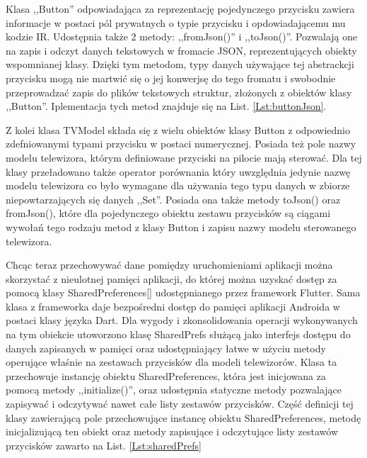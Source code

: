 \documentclass[12pt,twoside]{article}
\begin{document}
Klasa ,,Button'' odpowiadająca za reprezentację  pojedynczego przycisku zawiera informacje w postaci pól prywatnych o typie przycisku i opdowiadającemu mu kodzie IR. Udostępnia także 2 metody: ,,fromJson()'' i ,,toJson()''. Pozwalają one na zapis i odczyt danych tekstowych w fromacie JSON, reprezentujących obiekty wspomnianej klasy. Dzięki tym metodom, typy danych używające tej abstrackcji przycisku mogą nie martwić się o jej konwerjsę do tego fromatu i swobodnie przeprowadzać zapis do plików tekstowych struktur, złożonych z obiektów klasy ,,Button''. Iplementacja tych metod znajduje się na List. \ref*{Lst:buttonJson}.


Z kolei klasa TVModel składa się z wielu obiektów klasy Button z odpowiednio zdefniowanymi typami przycisku w postaci numerycznej. Posiada też pole nazwy modelu telewizora, którym definiowane przyciski na pilocie mają sterować. Dla tej klasy przeładowano także operator porównania który uwzględnia jedynie nazwę modelu telewizora co było wymagane dla używania tego typu danych w zbiorze niepowtarzających się danych ,,Set''. Posiada ona także metody toJson() oraz fromJson(), które dla pojedynczego obiektu zestawu przycisków są ciągami wywołań tego rodzaju metod z klasy Button i zapisu nazwy modelu sterowanego telewizora. 

Chcąc teraz przechowywać dane pomiędzy uruchomieniami aplikacji można skorzystać z nieulotnej pamięci aplikacji, do której można uzyskać dostęp za pomocą klasy SharedPreferences[] udostępnianego przez framework Flutter. Sama klasa z frameworka daje bezpośredni dostęp do pamięci aplikacji Androida w postaci klasy języka Dart. Dla wygody i zkonsolidowania operacji wykonywanych na tym obiekcie utoworzono klasę SharedPrefs służącą jako interfejs dostępu do danych zapisanych w pamięci oraz udostępniający łatwe w użyciu metody operujące właśnie na zestawach przycisków dla modeli telewizorów. Klasa ta przechowuje instancję obiektu SharedPreferences, która jest inicjowana za pomocą metody ,,initialize()'', oraz udostępnia statyczne metody pozwalające zapisywać i odczytywać nawet całe listy zestawów przycisków. Część definicji tej klasy zawierającą pole przechowujące instancę obiektu SharedPreferences, metodę inicjalizującą ten obiekt oraz metody zapisujące i odczytujące listy zestawów przycisków zawarto na List. \ref*{Lst:sharedPrefs}


\end{document}
